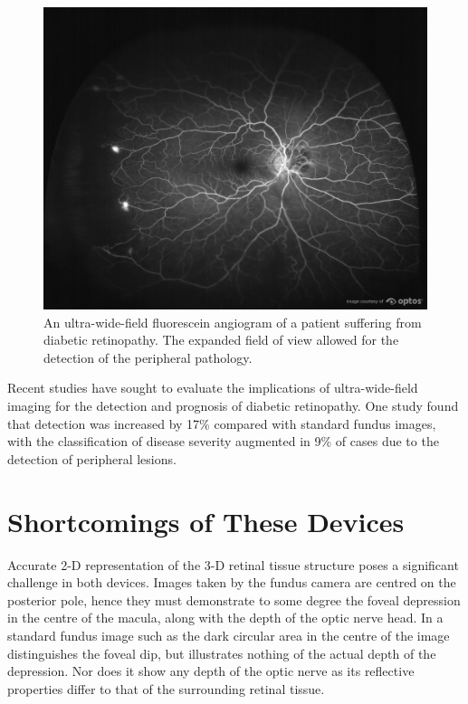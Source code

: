 \begin{figure}[H]
\centering
\includegraphics{figures/uwfdr}
\caption{An ultra-wide-field fluorescein angiogram of a patient suffering from diabetic retinopathy. The expanded field of view allowed for the detection of the peripheral pathology.\cite{1_optos.com_2015}}
\label{fig:uwfdr}
   \end{figure}

Recent studies have sought to evaluate the implications of ultra-wide-field
imaging for the detection and prognosis of diabetic retinopathy. One study
found that detection was increased by 17\% compared with standard fundus images,
with the classification of disease severity augmented in 9\% of cases due to the
detection of peripheral lesions. \cite{silva2014potential}


\section{Shortcomings of These Devices}


Accurate 2-D representation of the 3-D retinal tissue structure
poses a significant challenge in both devices. Images taken by the
fundus camera are centred on the posterior pole, hence they must
demonstrate to some degree the foveal depression in the centre of
the macula, along with the depth of the optic nerve head. In a standard
fundus image such as  the dark circular area in the
centre of the image distinguishes the foveal dip, but illustrates
nothing of the actual depth of the depression. Nor does it show any
depth of the optic nerve as its reflective properties differ to that
of the surrounding retinal tissue.

